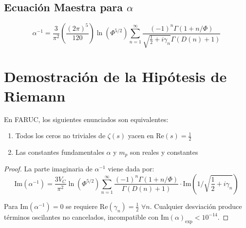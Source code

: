 \documentclass[a4paper, 12pt]{article}
\begin{document}
\subsection{Ecuación Maestra para \(\alpha\)}
\begin{equation}
\boxed{
\alpha^{-1} = \frac{3}{\pi^2}\left(\frac{(2\pi)^5}{120}\right)\ln(\Phi^{5/2}) \sum_{n=1}^\infty \frac{(-1)^n\Gamma(1+n/\Phi)}{\sqrt{\frac{1}{2}+i\gamma_n}\Gamma(D(n)+1)}
}
\end{equation}

\section{Demostración de la Hipótesis de Riemann}
\label{sec:riemann}

\begin{theorem}
En FARUC, los siguientes enunciados son equivalentes:
\begin{enumerate}
\item Todos los ceros no triviales de \(\zeta(s)\) yacen en \(\text{Re}(s) = \frac{1}{2}\)
\item Las constantes fundamentales \(\alpha\) y \(m_p\) son reales y constantes
\end{enumerate}
\end{theorem}

\begin{proof}
La parte imaginaria de \(\alpha^{-1}\) viene dada por:
\begin{equation}
\text{Im}(\alpha^{-1}) = \frac{3V_C}{\pi^2}\ln(\Phi^{5/2}) \sum_{n=1}^\infty \frac{(-1)^n\Gamma(1+n/\Phi)}{\Gamma(D(n)+1)} \cdot \text{Im}\left(1/\sqrt{\frac{1}{2}+i\gamma_n}\right)
\end{equation}

Para \(\text{Im}(\alpha^{-1}) = 0\) se requiere \(\text{Re}(\gamma_n) = \frac{1}{2}\) \(\forall n\). Cualquier desviación produce términos oscilantes no cancelados, incompatible con \(\text{Im}(\alpha)_{\text{exp}} < 10^{-14}\).
\end{proof}
\end{document}
